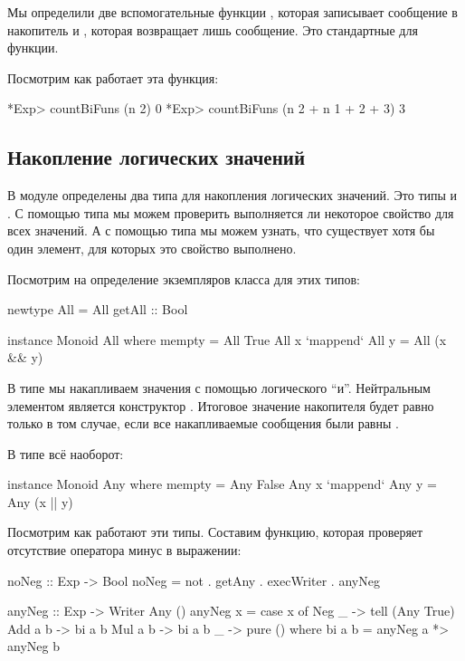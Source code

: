 Мы определили две вспомогательные функции , которая записывает
сообщение в накопитель и , которая возвращает лишь
сообщение. Это стандартные для  функции.

Посмотрим как работает эта функция:


\begin{code}
*Exp> countBiFuns (n 2)
0
*Exp> countBiFuns (n 2 + n 1 + 2 + 3)
3
\end{code}

\subsection{Накопление логических значений}

В модуле  определены два типа для накопления логических
значений. Это типы  и . С помощью типа  мы можем
проверить выполняется ли некоторое свойство для всех значений. А с
помощью типа  мы можем узнать, что существует хотя бы один
элемент, для которых это свойство выполнено.

Посмотрим на определение экземпляров класса  для этих типов:


\begin{code}
newtype All = All { getAll :: Bool }

instance Monoid All where
        mempty = All True
        All x `mappend` All y = All (x && y)
\end{code}

В типе  мы накапливаем значения с помощью логического ``и''.
Нейтральным элементом является конструктор . Итоговое значение
накопителя будет равно  только в том случае, если все
накапливаемые сообщения были равны .

В типе  всё наоборот:


\begin{code}
instance Monoid Any where
        mempty = Any False
        Any x `mappend` Any y = Any (x || y)
\end{code}

Посмотрим как работают эти типы. Составим функцию, которая проверяет
отсутствие оператора минус в выражении:


\begin{code}
noNeg :: Exp -> Bool
noNeg = not . getAny . execWriter . anyNeg

anyNeg :: Exp -> Writer Any ()
anyNeg x = case x of
    Neg _   -> tell (Any True)
    Add a b -> bi a b
    Mul a b -> bi a b
    _       -> pure ()
    where bi a b = anyNeg a *> anyNeg b            
\end{code}

